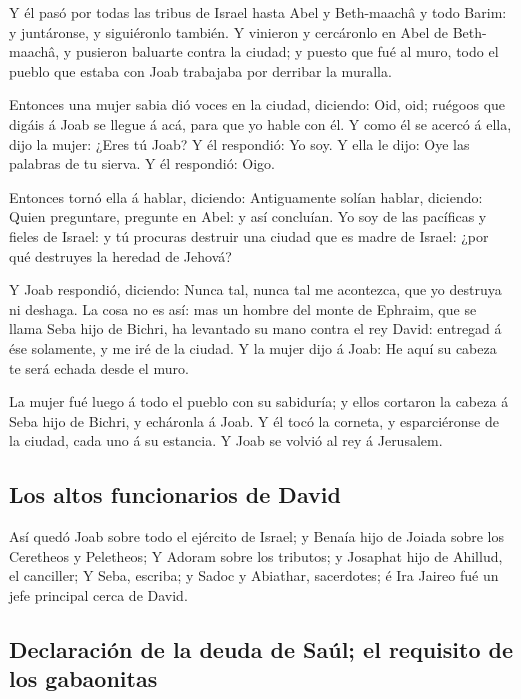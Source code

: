  Y él pasó por todas las tribus de Israel hasta Abel y
Beth-maachâ y todo Barim: y juntáronse, y siguiéronlo también.
 Y vinieron y cercáronlo en Abel de Beth-maachâ, y
pusieron baluarte contra la ciudad; y puesto que fué al muro, todo el
pueblo que estaba con Joab trabajaba por derribar la muralla.

 Entonces una mujer sabia dió voces en la ciudad,
diciendo: Oid, oid; ruégoos que digáis á Joab se llegue á acá, para que
yo hable con él.  Y como él se acercó á ella, dijo la
mujer: ¿Eres tú Joab? Y él respondió: Yo soy. Y ella le dijo: Oye las
palabras de tu sierva. Y él respondió: Oigo.

 Entonces tornó ella á hablar, diciendo: Antiguamente
solían hablar, diciendo: Quien preguntare, pregunte en Abel: y así
concluían.  Yo soy de las pacíficas y fieles de Israel: y
tú procuras destruir una ciudad que es madre de Israel: ¿por qué
destruyes la heredad de Jehová?

 Y Joab respondió, diciendo: Nunca tal, nunca tal me
acontezca, que yo destruya ni deshaga.  La cosa no es
así: mas un hombre del monte de Ephraim, que se llama Seba hijo de
Bichri, ha levantado su mano contra el rey David: entregad á ése
solamente, y me iré de la ciudad. Y la mujer dijo á Joab: He aquí su
cabeza te será echada desde el muro.

 La mujer fué luego á todo el pueblo con su sabiduría; y
ellos cortaron la cabeza á Seba hijo de Bichri, y echáronla á Joab. Y él
tocó la corneta, y esparciéronse de la ciudad, cada uno á su estancia. Y
Joab se volvió al rey á Jerusalem.

\hypertarget{los-altos-funcionarios-de-david}{%
\subsection{Los altos funcionarios de
David}\label{los-altos-funcionarios-de-david}}

 Así quedó Joab sobre todo el ejército de Israel; y
Benaía hijo de Joiada sobre los Ceretheos y Peletheos;  Y
Adoram sobre los tributos; y Josaphat hijo de Ahillud, el canciller;
 Y Seba, escriba; y Sadoc y Abiathar, sacerdotes; é Ira
Jaireo fué un jefe principal cerca de David.

\hypertarget{declaraciuxf3n-de-la-deuda-de-sauxfal-el-requisito-de-los-gabaonitas}{%
\subsection{Declaración de la deuda de Saúl; el requisito de los
gabaonitas}\label{declaraciuxf3n-de-la-deuda-de-sauxfal-el-requisito-de-los-gabaonitas}}


